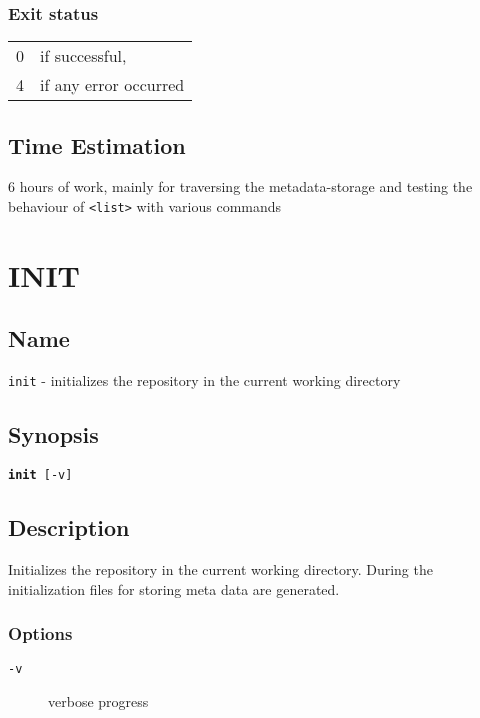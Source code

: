 \documentclass{article} %
\begin{document}
		\subsubsection*{Exit status}
		\begin{tabular}{ll}
			0 &  if successful,\\ 
			4 &  if any error occurred\\
		\end{tabular}
				\subsection*{Time Estimation}
				6 hours of work, mainly for traversing the metadata-storage and testing the behaviour of \texttt{<list>} with various commands \\
				\noindent
		\newpage
		
		\section*{INIT}
		\subsection*{Name}
		\texttt{init} - initializes the repository in the current working directory
		\subsection*{Synopsis}
		\texttt{\textbf{init} [-v]}
		\subsection*{Description}
		Initializes the repository in the current working directory.
		During the initialization files for storing meta data are generated.\\
		
		\noindent
		\subsubsection*{Options}
		\begin{description}
			\item[\texttt{-v}] verbose progress
		\end{description}
		
\end{document}
